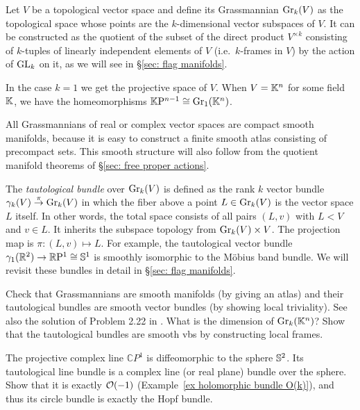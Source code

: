 \begin{example}
    Let $V$ be a topological vector space and define its Grassmannian $\operatorname{Gr}_k(V)$ as the topological space whose points are the $k$-dimensional vector subspaces of $V$. It can be constructed as the quotient of the subset of the direct product $V^{\times k}$ consisting of $k$-tuples of linearly independent elements of $V$ (i.e.\ $k$-frames in $V$) by the action of $\operatorname{GL}_k$ on it, as we will see in \S\ref{sec: flag manifolds}.
    
    In the case $k=1$ we get the projective space of $V$. When $V=\mathbb{K}^n$ for some field $\mathbb{K}$, we have the homeomorphisms $\mathbb{K}\mathrm{P}^{n-1}\cong \operatorname{Gr}_1(\mathbb{K}^n)$.
    
    All Grassmannians of real or complex vector spaces are compact smooth manifolds, because it is easy to construct a finite smooth atlas consisting of precompact sets. This smooth structure will also follow from the quotient manifold theorems of \S\ref{sec: free proper actions}.
    
    The \emph{tautological bundle} over $\operatorname{Gr}_k(V)$ is defined as the rank $k$ vector bundle $\gamma_{k}(V)\overset\pi\to \operatorname{Gr}_k(V)$ in which the fiber above a point $L\in \operatorname{Gr}_k(V)$ is the vector space $L$ itself. In other words, the total space consists of all pairs $(L,v)$ with $L<V$ and $v\in L$. It inherits the subspace topology from $\operatorname{Gr}_k(V)\times V$. The projection map is $\pi:(L,v)\mapsto L$.  For example, the tautological vector bundle $\gamma_1(\mathbb{R}^2)\to \mathbb{R}\mathrm{P}^1\cong \mathbb{S}^1$ is smoothly isomorphic to the M\"obius band bundle. We will revisit these bundles in detail in \S\ref{sec: flag manifolds}.
\end{example}

\begin{xca}
    Check that Grassmannians are smooth manifolds (by giving an atlas) and their tautological bundles are smooth vector bundles (by showing local triviality). See also the solution of Problem 2.22 in \cite{Gadea}. What is the dimension of $\operatorname{Gr}_k(\mathbb{K}^n)$? Show that the tautological bundles are smooth \glspl{vb} by constructing local frames.
\end{xca}

\begin{xca}\label{xca hopf complex line bundle}
    The projective complex line $\mathbb{C}P^1$ is diffeomorphic to the sphere $\mathbb{S}^2$. Its tautological line bundle is a complex line (or real plane) bundle over the sphere. Show that it is exactly $\mathcal{O}(-1)$ (Example~\ref{ex holomorphic bundle O(k)}), and thus its circle bundle is exactly the Hopf bundle.
\end{xca}









